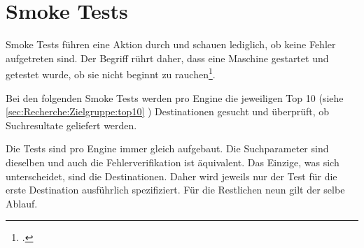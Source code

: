 



\section{Smoke Tests}
\label{sec:konzept:smoketests}
Smoke Tests führen eine Aktion durch und schauen lediglich, ob keine Fehler aufgetreten sind. Der Begriff rührt daher, dass eine Maschine gestartet und getestet wurde, ob sie nicht beginnt zu rauchen\footcite{Smoke_testing_software_-_Wikipedia_the_free_encyclopedia_2015-08-01}.

Bei den folgenden Smoke Tests werden pro Engine die jeweiligen Top 10 (siehe \cref{sec:Recherche:Zielgruppe:top10} ) Destinationen gesucht und überprüft, ob Suchresultate geliefert werden.

Die Tests sind pro Engine immer gleich aufgebaut. Die Suchparameter sind dieselben und auch die Fehlerverifikation ist äquivalent. Das Einzige, was sich unterscheidet, sind die Destinationen. Daher wird jeweils nur der Test für die erste Destination ausführlich spezifiziert. Für die Restlichen neun gilt der selbe Ablauf.







